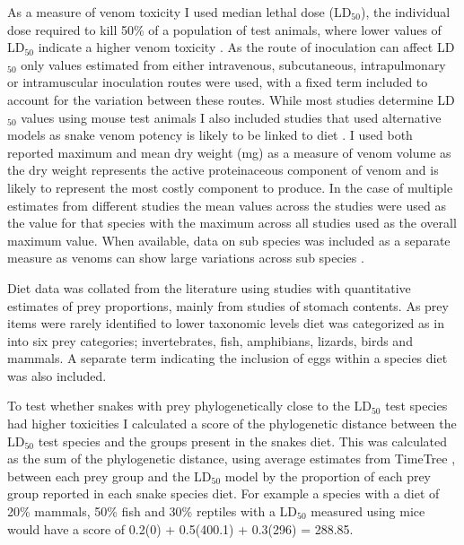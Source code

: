 As a measure of venom toxicity I used median lethal dose (LD$_{50}$), the individual dose required to kill 50\% of a population of test animals, where lower values of LD$_{50}$ indicate a higher venom toxicity \citep{chippaux1991snake}. As the route of inoculation can affect LD$_{50}$ \citep{chippaux1991snake} only values estimated from either intravenous, subcutaneous, intrapulmonary or intramuscular inoculation routes were used, with a fixed term included to account for the variation between these routes. While most studies determine LD$_{50}$ values using mouse test animals I also included studies that used alternative models as snake venom potency is likely to be linked to diet \citep{barlow2009coevolution}. I used both reported maximum and mean dry weight (mg) as a measure of venom volume as the dry weight represents the active proteinaceous component of venom and is likely to represent the most costly component to produce. In the case of multiple estimates from different studies the mean values across the studies were used as the value for that species with the maximum across all studies used as the overall maximum value. When available, data on sub species was included as a separate measure as venoms can show large variations across sub species \citep{chippaux1991snake}.


Diet data was collated from the literature using studies with quantitative estimates of prey proportions, mainly from studies of stomach contents. As prey items were rarely identified to lower taxonomic levels diet was categorized as in \cite{allen2013evolution} into six prey categories; invertebrates, fish, amphibians, lizards, birds and mammals. A separate term indicating the inclusion of eggs within a species diet was also included.


To test whether snakes with prey phylogenetically close to the LD$_{50}$ test species had higher toxicities I calculated a score of the phylogenetic distance between the LD$_{50}$ test species and the groups present in the snakes diet. This was calculated as the sum of the phylogenetic distance, using average estimates from TimeTree \citep{hedges2006timetree}, between each prey group and the LD$_{50}$ model by the proportion of each prey group reported in each snake species diet. For example a species with a diet of 20\% mammals, 50\% fish and 30\% reptiles with a LD$_{50}$ measured using mice would have a score of 0.2\*(0) + 0.5\*(400.1) + 0.3\*(296) = 288.85.



